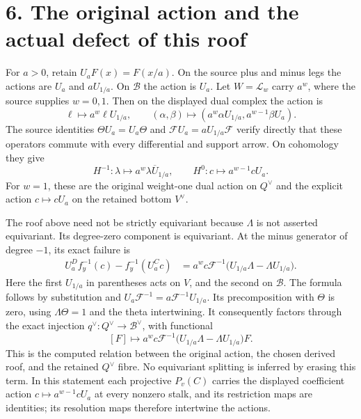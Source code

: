 \documentclass[
  11pt,
]{article}
\begin{document}
\section{6. The original action and the actual defect of this
roof}\label{the-original-action-and-the-actual-defect-of-this-roof}

For \(a>0\), retain \(U_aF(x)=F(x/a)\). On the source plus and minus
legs the actions are \(U_a\) and \(aU_{1/a}\). On \(\mathscr B\) the
action is \(U_a\). Let \(W=\mathcal L_w\) carry \(a^w\), where the
source supplies \(w=0,1\). Then on the displayed dual complex the action
is \[
\ell\longmapsto a^w\ell U_{1/a},
\qquad
(\alpha,\beta)\longmapsto
(a^w\alpha U_{1/a},a^{w-1}\beta U_a).
\] The source identities \(\Theta U_a=U_a\Theta\) and
\(\mathcal F U_a=aU_{1/a}\mathcal F\) verify directly that these
operators commute with every differential and support arrow. On
cohomology they give \[
H^{-1}:\lambda\longmapsto a^w\lambda\overline U_{1/a},
\qquad
H^0:c\longmapsto a^{w-1}cU_a.
\] For \(w=1\), these are the original weight-one dual action on
\(Q^\vee\) and the explicit action \(c\mapsto cU_a\) on the retained
bottom \(V^\vee\).

The roof above need not be strictly equivariant because \(\Lambda\) is
not asserted equivariant. Its degree-zero component is equivariant. At
the minus generator of degree \(-1\), its exact failure is \[
\begin{aligned}
U_a^{D}f_y^{-1}(c)-f_y^{-1}(U_a^{C}c)
&=a^w c\mathcal F^{-1}
\bigl(U_{1/a}\Lambda-\Lambda U_{1/a}\bigr).
\end{aligned}
\] Here the first \(U_{1/a}\) in parentheses acts on \(V\), and the
second on \(\mathscr B\). The formula follows by substitution and
\(U_a\mathcal F^{-1}=a\mathcal F^{-1}U_{1/a}\). Its precomposition with
\(\Theta\) is zero, using \(\Lambda\Theta=1\) and the theta
intertwining. It consequently factors through the exact injection
\(q^\vee:Q^\vee\to\mathscr B^\vee\), with functional \[
[F]\longmapsto a^w c\mathcal F^{-1}
\bigl(U_{1/a}\Lambda-\Lambda U_{1/a}\bigr)F.
\] This is the computed relation between the original action, the chosen
derived roof, and the retained \(Q^\vee\) fibre. No equivariant
splitting is inferred by erasing this term. In this statement each
projective \(P_v(C)\) carries the displayed coefficient action
\(c\mapsto a^{w-1}cU_a\) at every nonzero stalk, and its restriction
maps are identities; its resolution maps therefore intertwine the
actions.
\end{document}
